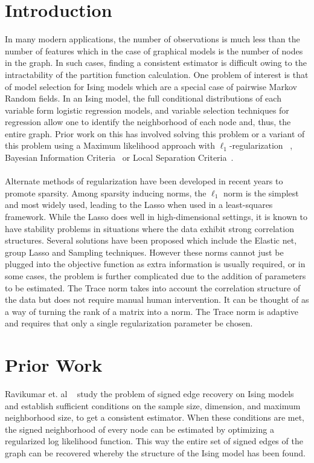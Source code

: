 \documentclass[11pt]{article}
\begin{document}
\section{Introduction}
In many modern applications, the number of observations is much less than the number of features which in the case of graphical models is the number of nodes in the graph. In such cases, finding a consistent estimator is difficult owing to the intractability of the partition function calculation. One problem of interest is that of model selection for Ising models which are a special case of pairwise Markov Random fields. In an Ising model, the full conditional distributions of each variable form logistic regression models, and variable selection techniques for regression allow one to identify the neighborhood of each node and, thus, the entire graph. Prior work on this has involved solving this problem or a variant of this problem using a Maximum likelihood approach with $\ell_1$-regularization ~\cite{ravikumar2010high}, Bayesian Information Criteria~\cite{barber2015high} or Local Separation Criteria~\cite{anandkumar2012high}. \\ \\
Alternate methods of regularization have been developed in recent years to promote sparsity. Among sparsity inducing norms, the $\ell_1$ norm is the simplest and most widely used, leading to the Lasso when used in a least-squares framework. While the Lasso does well in high-dimensional settings, it is known to have stability problems in situations where the data exhibit strong correlation structures. Several solutions have been proposed which include the Elastic net, group Lasso and Sampling techniques. However these norms cannot just be plugged into the objective function as extra information is usually required, or in some cases, the problem is further complicated due to the addition of parameters to be estimated. The Trace norm takes into account the correlation structure of the data but does not require manual human intervention. It can be thought of as a way of turning the rank of a matrix into a norm. The Trace norm is adaptive and requires that only a single regularization parameter be chosen. 	

\section{Prior Work}
Ravikumar et. al ~\cite{ravikumar2010high} study the problem of signed edge recovery on Ising models and establish sufficient conditions on the sample size, dimension, and maximum neighborhood size, to get a consistent estimator. When these conditions are met, the signed neighborhood of every node can be estimated by optimizing a regularized log likelihood function. This way the entire set of signed edges of the graph can be recovered whereby the structure of the Ising model has been found.
\end{document}
